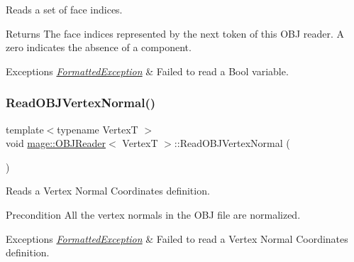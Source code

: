 Reads a set of face indices.

\begin{DoxyReturn}{Returns}
The face indices represented by the next token of this O\+BJ reader. A zero indicates the absence of a component. 
\end{DoxyReturn}

\begin{DoxyExceptions}{Exceptions}
{\em \hyperlink{classmage_1_1_formatted_exception}{Formatted\+Exception}} & Failed to read a Bool variable. \\
\hline
\end{DoxyExceptions}
\hypertarget{classmage_1_1_o_b_j_reader_aa9ef2ced0ad787b13818722c7dfa0636}{}\label{classmage_1_1_o_b_j_reader_aa9ef2ced0ad787b13818722c7dfa0636} 
\subsubsection{\texorpdfstring{Read\+O\+B\+J\+Vertex\+Normal()}{ReadOBJVertexNormal()}}
{\footnotesize\ttfamily template$<$typename VertexT $>$ \\
void \hyperlink{classmage_1_1_o_b_j_reader}{mage\+::\+O\+B\+J\+Reader}$<$ VertexT $>$\+::Read\+O\+B\+J\+Vertex\+Normal (\begin{DoxyParamCaption}{ }\end{DoxyParamCaption})\hspace{0.3cm}{\ttfamily [private]}}

Reads a Vertex Normal Coordinates definition.

\begin{DoxyPrecond}{Precondition}
All the vertex normals in the O\+BJ file are normalized. 
\end{DoxyPrecond}

\begin{DoxyExceptions}{Exceptions}
{\em \hyperlink{classmage_1_1_formatted_exception}{Formatted\+Exception}} & Failed to read a Vertex Normal Coordinates definition. \\
\hline
\end{DoxyExceptions}
\hypertarget{classmage_1_1_o_b_j_reader_a2be022b43cf2ad848c7a2d013b16e5f2}{}\label{classmage_1_1_o_b_j_reader_a2be022b43cf2ad848c7a2d013b16e5f2} 
